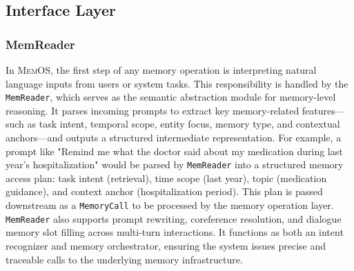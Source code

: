 \documentclass[]{memtensor}
\begin{document}
\subsection{Interface Layer}

\subsubsection{MemReader}
In \textsc{MemOS}, the first step of any memory operation is interpreting natural language inputs from users or system tasks. This responsibility is handled by the \texttt{MemReader}, which serves as the semantic abstraction module for memory-level reasoning. It parses incoming prompts to extract key memory-related features—such as task intent, temporal scope, entity focus, memory type, and contextual anchors—and outputs a structured intermediate representation.
For example, a prompt like "Remind me what the doctor said about my medication during last year's hospitalization" would be parsed by \texttt{MemReader} into a structured memory access plan: task intent (retrieval), time scope (last year), topic (medication guidance), and context anchor (hospitalization period). This plan is passed downstream as a \texttt{MemoryCall} to be processed by the memory operation layer.
\texttt{MemReader} also supports prompt rewriting, coreference resolution, and dialogue memory slot filling across multi-turn interactions. It functions as both an intent recognizer and memory orchestrator, ensuring the system issues precise and traceable calls to the underlying memory infrastructure.
\end{document}

